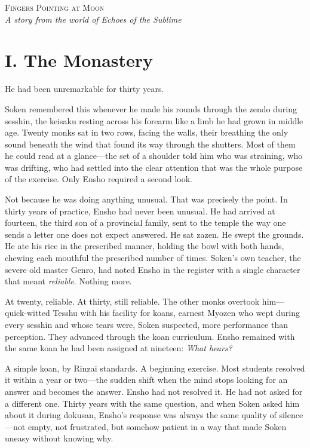\begin{center}
{\LARGE\scshape Fingers Pointing at Moon}\\[1.5em]
{\large\itshape A story from the world of Echoes of the Sublime}\\[3em]
\end{center}

\section*{I. The Monastery}

He had been unremarkable for thirty years.

Soken remembered this whenever he made his rounds through the zendo during sesshin, the keisaku resting across his forearm like a limb he had grown in middle age. Twenty monks sat in two rows, facing the walls, their breathing the only sound beneath the wind that found its way through the shutters. Most of them he could read at a glance---the set of a shoulder told him who was straining, who was drifting, who had settled into the clear attention that was the whole purpose of the exercise. Only Ensho required a second look.

Not because he was doing anything unusual. That was precisely the point. In thirty years of practice, Ensho had never been unusual. He had arrived at fourteen, the third son of a provincial family, sent to the temple the way one sends a letter one does not expect answered. He sat zazen. He swept the grounds. He ate his rice in the prescribed manner, holding the bowl with both hands, chewing each mouthful the prescribed number of times. Soken's own teacher, the severe old master Genro, had noted Ensho in the register with a single character that meant \emph{reliable}. Nothing more.

At twenty, reliable. At thirty, still reliable. The other monks overtook him---quick-witted Tesshu with his facility for koans, earnest Myozen who wept during every sesshin and whose tears were, Soken suspected, more performance than perception. They advanced through the koan curriculum. Ensho remained with the same koan he had been assigned at nineteen: \emph{What hears?}

A simple koan, by Rinzai standards. A beginning exercise. Most students resolved it within a year or two---the sudden shift when the mind stops looking for an answer and becomes the answer. Ensho had not resolved it. He had not asked for a different one. Thirty years with the same question, and when Soken asked him about it during dokusan, Ensho's response was always the same quality of silence---not empty, not frustrated, but somehow patient in a way that made Soken uneasy without knowing why.

